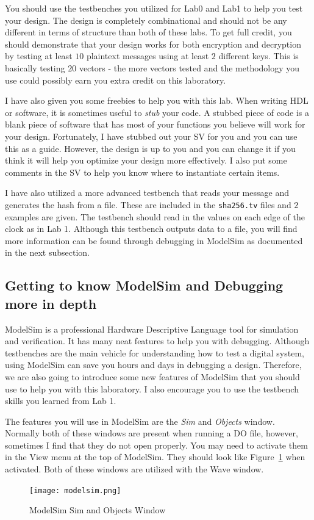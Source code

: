 \documentclass{article}
\begin{document}
You should use the testbenches you utilized for Lab0 and Lab1 to help
you test your design.  The design is completely combinational and
should not be any different in terms of structure than both of these
labs.  To get full credit, you should demonstrate that your design
works for both encryption and decryption by testing at least $10$
plaintext messages using at least $2$ different keys.  This is
basically testing $20$ vectors - the more vectors tested and the
methodology you use could possibly
earn you extra credit on this laboratory.

I have also given you some freebies to help you with this lab.  When
writing HDL or software, it is sometimes useful to \textit{stub} your
code.  A stubbed piece of code is a blank piece of software that has
most of your functions you believe will work for your design.
Fortunately, I have stubbed out your SV for you and you can use this
as a guide.  However, the design is up to you and you can change it if
you think it will help you optimize your design more effectively.
I also put some comments in the SV to help you know where
to instantiate certain items.

I have also utilized a more advanced testbench that reads your
message and generates the hash from a file.  These are included in the
\verb!sha256.tv! files and $2$ examples are given.  The testbench should
read in the values on each edge of the clock as in Lab 1.  Although
this testbench outputs data to a file, you will find more information
can be found through debugging in ModelSim as documented in the next
subsection.

\subsection{Getting to know ModelSim and Debugging more in depth}

ModelSim is a professional Hardware Descriptive Language tool for
simulation and verification.  It has many neat features to help you
with debugging.  Although testbenches are the main vehicle for
understanding how to test a digital system, using ModelSim can save
you hours and days in debugging a design.  Therefore, we are also
going to introduce some new features of ModelSim that you should use
to help you with this laboratory. I also encourage you to use the
testbench skills you learned from Lab 1.

The features you will use in ModelSim are the \textit{Sim} and
\textit{Objects} window.  Normally both of these windows are present
when running a DO file, however, sometimes I find that they do not
open properly.  You may need to activate them in the View menu at the
top of ModelSim.  They should look like Figure~\ref{modelsim.png} when
activated.  Both of these windows are utilized with the Wave window.
\begin{figure} [t!]
  \centering
  \texttt{[image: modelsim.png]}
  \caption{ModelSim Sim and Objects Window}
  \label{modelsim.png}
\end{figure}
\end{document}
